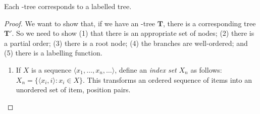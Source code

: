 \begin{theorem}
	Each \lone-tree corresponds to a labelled tree. \begin{proof}
		We want to show that, if we have an \lone-tree $\mathbf{T}$, there is a corresponding tree $\mathbf{T}'$. So we need to show (1) that there is an appropriate set of nodes; (2) there is a partial order; (3) there is a root node; (4) the branches are well-ordered; and (5) there is a labelling function. \begin{enumerate}
			\item If $X$ is a sequence $\langle x_{1},…,x_{n},…\rangle$, define an \emph{index set} $X_{n}$ as follows: $X_{n} = \{\langle x_{i},i\rangle: x_{i} \in X\}$. This transforms an ordered sequence of items into an unordered set of item, position pairs.


\end{enumerate}
\end{proof}
\end{theorem}
